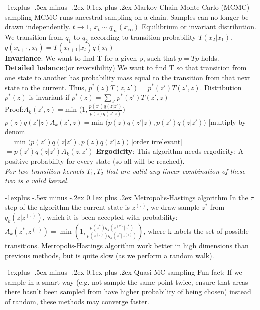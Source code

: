 \documentclass[9pt,landscape]{article}
\makeatletter
\renewcommand{\subsection}{\@startsection{subsection}{2}{0mm}%
                                {-1explus -.5ex minus -.2ex}%
                                {0.1ex plus .2ex}%
                                {\normalfont\scriptsize\bfseries}}
\makeatother
\begin{document}
\begin{multicols}{3}
\subsection{Markov Chain Monte-Carlo (MCMC) sampling}
MCMC runs ancestral sampling on a chain. Samples can no longer be drawn independently.
$t \rightarrow 1$, $x_t \sim q_{\infty}(x_{\infty})$ Equilibrium or invariant distribution. We transition from $q_1$ to $q_2$ according to transition probability $T(x_2|x_1)$.\\
$q(x_{t+1}, x_t) = T(x_{t+1}|x_t)q(x_t)$\\
\textbf{Invariance}:
We want to find T for a given p, such that $p = T p$ holds.\\
\textbf{Detailed balance}:(or reversibility) We want to find T so that transition from one state to another has probability mass equal to the transition from that next state to the current. Thus, $p^*(z)T(z,z') = p^*(z')T(z',z)$. Distribution $p^*(z)$ is invariant if $p^*(z)=\sum_{z'}p^*(z')T(z',z)$\\ Proof:$A_k(z',z) = \text{min }\big( 1, \frac{p(z')q(z|z')}{p(z)q(z'|z)} \big)$\\
$p(z)q(z'|z)A_k(z',z) = \text{min } \big( p(z)q(z'|z),p(z')q(z|z') \big)$ [multiply by denom]\\
$= \text{min }\big(p(z')q(z|z'), p(z)q(z'|z) \big)$ [order irrelevant]\\
$= p(z')q(z|z')A_k(z,z')$
\textbf{Ergodicity}:
This algorithm needs ergodicity: A positive probability for every state (so all will be reached).\\
\textit{For two transition kernels $T_1, T_2$ that are valid any linear combination of these two is a valid kernel.}

\subsection{Metropolis-Hastings algorithm}
In the $\tau$ step of the algorithm the current state is $z^{(\tau)}$, we draw sample $z^*$ from $q_k(z|z^{(\tau)})$, which it is been accepted with probability: $ A_k(z^*,z^{(\tau)}) =\min (1, \frac{p(z^*) q_k(z^{(\tau)}|z^*)}{p(z^{(\tau)}) q_k(z^*|z^{(\tau)})}) $, where k labels the set of possible transitions. Metropolis-Hastings algorithm work better in high dimensions than previous methods, but is quite slow (as we perform a random walk).


\subsection{Quasi-MC sampling}
Fun fact: If we sample in a smart way (e.g. not sample the same point twice, ensure that areas there hasn't been sampled from have higher probability of being chosen) instead of random, these methods may converge faster.


\end{multicols}
\end{document}

